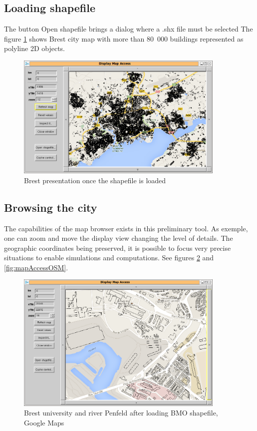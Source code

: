 \subsection{Loading shapefile}

The button Open shapefile brings a dialog where a .shx file must be selected 
The figure \ref{fig:mapAccessFilled} shows Brest city map with 
more than 80~000 buildings represented as polyline 2D objects. 

\begin{figure}
\begin{center}
\includegraphics[width=10cm]{mapAccessFilled.png}
\caption{Brest presentation once the shapefile is loaded}
\label{fig:mapAccessFilled}
\end{center}
\end{figure}

\subsection{Browsing the city}

The capabilities of the map browser exists in this preliminary tool. 
As exemple, one can zoom and move the display view changing the level 
of details. The geographic coordinates being preserved, it is possible 
to focus very precise situations to enable simulations and computations. 
See figures \ref{fig:mapAccessGMap} and \ref{fig:mapAccessOSM}. 

\begin{figure}
\begin{center}
\includegraphics[width=10cm]{mapAccessPenfeldGMap.png}
\caption{Brest university and river Penfeld after loading BMO shapefile, 
Google Maps}
\label{fig:mapAccessGMap}
\end{center}
\end{figure}

